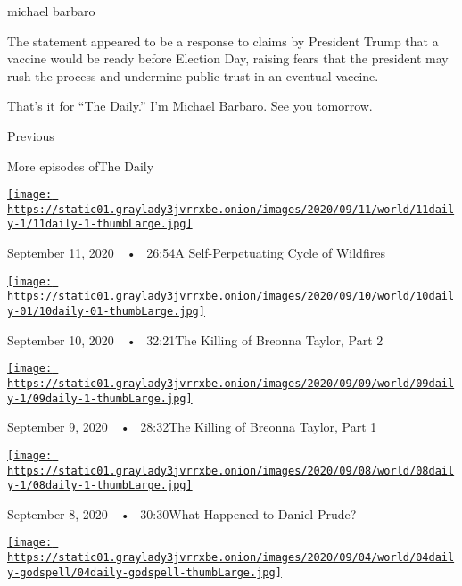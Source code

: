 michael barbaro

The statement appeared to be a response to claims by President Trump
that a vaccine would be ready before Election Day, raising fears that
the president may rush the process and undermine public trust in an
eventual vaccine.

That's it for ``The Daily.'' I'm Michael Barbaro. See you tomorrow.

Previous

More episodes ofThe Daily

\href{https://www.nytimes3xbfgragh.onion/2020/09/11/podcasts/the-daily/wildfires-california-fire-zones.html?action=click\&module=audio-series-bar\&region=header\&pgtype=Article}{\texttt{[image: https://static01.graylady3jvrrxbe.onion/images/2020/09/11/world/11daily-1/11daily-1-thumbLarge.jpg]}}

September 11, 2020~~•~ 26:54A Self-Perpetuating Cycle of Wildfires

\href{https://www.nytimes3xbfgragh.onion/2020/09/10/podcasts/the-daily/Breonna-Taylor.html?action=click\&module=audio-series-bar\&region=header\&pgtype=Article}{\texttt{[image: https://static01.graylady3jvrrxbe.onion/images/2020/09/10/world/10daily-01/10daily-01-thumbLarge.jpg]}}

September 10, 2020~~•~ 32:21The Killing of Breonna Taylor, Part 2

\href{https://www.nytimes3xbfgragh.onion/2020/09/09/podcasts/the-daily/breonna-taylor.html?action=click\&module=audio-series-bar\&region=header\&pgtype=Article}{\texttt{[image: https://static01.graylady3jvrrxbe.onion/images/2020/09/09/world/09daily-1/09daily-1-thumbLarge.jpg]}}

September 9, 2020~~•~ 28:32The Killing of Breonna Taylor, Part 1

\href{https://www.nytimes3xbfgragh.onion/2020/09/08/podcasts/the-daily/Daniel-Prude-BLM-police.html?action=click\&module=audio-series-bar\&region=header\&pgtype=Article}{\texttt{[image: https://static01.graylady3jvrrxbe.onion/images/2020/09/08/world/08daily-1/08daily-1-thumbLarge.jpg]}}

September 8, 2020~~•~ 30:30What Happened to Daniel Prude?

\href{https://www.nytimes3xbfgragh.onion/2020/09/04/podcasts/the-daily/Godspell-theater-coronavirus.html?action=click\&module=audio-series-bar\&region=header\&pgtype=Article}{\texttt{[image: https://static01.graylady3jvrrxbe.onion/images/2020/09/04/world/04daily-godspell/04daily-godspell-thumbLarge.jpg]}}

